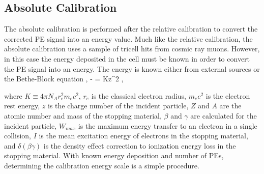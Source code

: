 \subsection{Absolute Calibration}
\label{sec:CalibAbs}

The absolute calibration is performed after the relative calibration to convert the corrected PE signal into an energy value. Much like the relative calibration, the absolute calibration uses a sample of tricell hits from cosmic ray muons. However, in this case the energy deposited in the cell must be known in order to convert the PE signal into an energy. The energy is known either from external sources \cite{ref:MuonTables} or the Bethe-Block equation \cite{ref:PDG},
\beq
\left\langle- \right\rangle = Kz^2   ,
\label{eq:BetheBlock}
\eeq

\n where $K \equiv 4\pi N_A r^2_e m_e c^2$, $r_e$ is the classical electron radius, $m_e c^2$ is the electron rest energy, $z$ is the charge number of the incident particle, $Z$ and $A$ are the atomic number and mass of the stopping material, $\beta$ and $\gamma$ are calculated for the incident particle, $W_{max}$ is the maximum energy transfer to an electron in a single collision, $I$ is the mean excitation energy of electrons in the stopping material, and $\delta(\beta\gamma)$ is the density effect correction to ionization energy loss in the stopping material. With known energy deposition and number of PEs, determining the calibration energy scale is a simple procedure.

